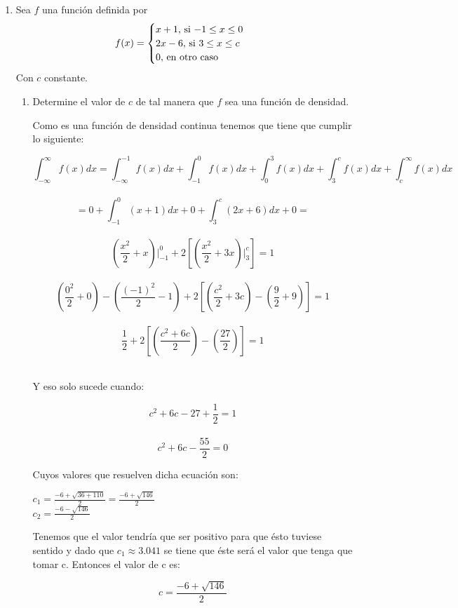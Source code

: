 \documentclass[12pt,a4paper]{report}
\begin{document}
\begin{enumerate}
		\item {
			Sea $f$ una función definida por
			\[
				f(x) = \begin{cases}
								x+1, $ si $ -1 \leq x \leq 0\\
								2x-6, $ si $ 3 \leq x \leq c\\
								0, $ en otro caso$
			\end{cases}
			\]
			Con $c$ constante.
			\begin{enumerate}
				\item{
					Determine el valor de $c$ de tal manera que $f$ sea una función de
					densidad.
					
					
					Como es una función de densidad continua tenemos que tiene que cumplir lo siguiente:
					\begin{center}
					    $$\int_{-\infty}^{\infty} f(x) dx = \int_{-\infty}^{-1}f(x)dx+\int_{-1}^{0}f(x)dx+\int_{0}^{3}f(x)dx+\int_{3}^{c}f(x)dx+\int_{c}^{\infty}f(x)dx$$\\
					    $$=0+\int_{-1}^{0}(x+1)dx+0+\int_{3}^{c}(2x+6)dx+0=$$\\ 
					    $$(\frac{x^2}{2}+x)|_{-1}^{0}+2[(\frac{x^2}{2}+3x)|_{3}^{c}]=1$$\\
					    $$(\frac{0^2}{2}+0)-(\frac{(-1)^2}{2}-1)+2[(\frac{c^2}{2}+3c)-(\frac{9}{2}+9)]=1$$ \\
					    $$\frac{1}{2}+2[(\frac{c^2+6c}{2})-(\frac{27}{2})]=1$$\\ 
					    \end{center}
					 Y eso solo sucede cuando: 
					\begin{center}
					    $$c^2+6c-27+\frac{1}{2}=1$$\\
					    $$c^2+6c-\frac{55}{2}=0$$
					\end{center}   
					Cuyos valores que resuelven dicha ecuación son:\\
					\begin{center}
					    $c_{1}=\frac{-6+\sqrt{36+110}}{2}=\frac{-6+\sqrt{146}}{2}$\\
					    $c_{2}=\frac{-6-\sqrt{146}}{2}$
					\end{center}
					Tenemos que el valor tendría que ser positivo para que ésto tuviese sentido y dado que $c_{1}\approx 3.041 $ se tiene que éste será el valor que tenga que tomar c. Entonces el valor de c es:
					\begin{center}
					   $$ c=\frac{-6+\sqrt{146}}{2}$$
					\end{center}
				    }
				

\end{enumerate}}
\end{enumerate}
\end{document}
